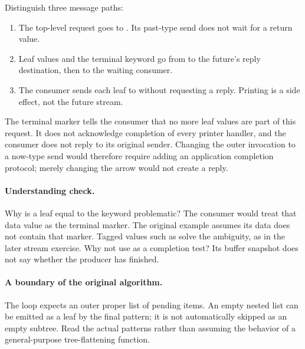 Distinguish three message paths:
\begin{enumerate}[nosep]
  \item The top-level request goes to . Its past-type
        send does not wait for a return value.
  \item Leaf values and the terminal keyword go from 
        to the future's reply destination, then to the waiting consumer.
  \item The consumer sends each leaf to  without requesting
        a reply. Printing is a side effect, not the future stream.
\end{enumerate}
The terminal marker tells the consumer that no more leaf values are part
of this request. It does not acknowledge completion of every printer
handler, and the consumer does not reply to its original sender.
Changing the outer invocation to a now-type send would therefore require
adding an application completion protocol; merely changing the arrow
would not create a reply.

\paragraph{Understanding check.}
Why is a leaf equal to the keyword  problematic?
The consumer would treat that data value as the terminal marker.
The original example assumes its data does not contain that marker.
Tagged values such as \code{[:value x]} solve the ambiguity, as in the
later stream exercise. Why not use  as a completion test?
Its buffer snapshot does not say whether the producer has finished.

\paragraph{A boundary of the original algorithm.}
The loop expects an outer proper list of pending items.
An empty nested list can be emitted as a  leaf by the final
pattern; it is not automatically skipped as an empty subtree.
Read the actual patterns rather than assuming the behavior of a
general-purpose tree-flattening function.
